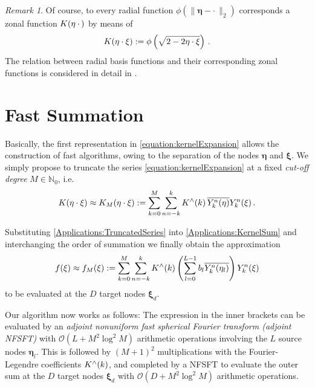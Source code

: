 \documentclass[11pt,a4paper,twoside,bibtotoc]{scrartcl}
\theoremstyle{plain}
\theoremstyle{definition}
\theoremstyle{remark}
\newtheorem{remark}[theorem]{Remark}
\newcommand{\NZ}{\ensuremath{\mathbb{N}_{0}}}
\newcommand{\fun}[2]{\ensuremath{#1{\hspace{-0.4ex}}\left(#2\right)}}
\numberwithin{equation}{section}
\numberwithin{table}{section}
\numberwithin{figure}{section}
\begin{document}
\begin{remark}
Of course, to every radial function $\phi(\|\mathbf{\eta} - \cdot \,\|_2)$ corresponds a zonal function 
$\fun{K}{\mathbf{\eta} \: \cdot \,}$ by means of 
\[
  \fun{K}{\mathbf{\eta} \cdot \mathbf{\xi}} := \phi\left(\sqrt{2-2\mathbf{\eta} \cdot
  \mathbf{\xi}}\right)\,.
\]
The relation between radial basis functions and their corresponding zonal
functions is considered in detail in \cite{CaFi}.
\end{remark}

\section{Fast Summation}
Basically, the first representation in \eqref{equation:kernelExpansion} allows
the construction of fast algorithms, owing to the separation of the
nodes $\mathbf{\eta}$ and $\mathbf{\xi}$.
We simply propose to truncate the series \eqref{equation:kernelExpansion} at a 
fixed \emph{cut-off degree} $M \in \NZ$, i.e.
\begin{equation}
  \label{Applications:TruncatedSeries}
  \fun{K}{\mathbf{\eta} \cdot \mathbf{\xi}} \approx \fun{K_{M}}{\mathbf{\eta} \cdot
  \mathbf{\xi}} := \sum_{k=0}^{M} \sum_{n=-k}^k \fun{K^{\wedge}}{k}
  \overline{\fun{Y_{k}^n}{\mathbf{\eta}}} \fun{Y_{k}^n}{\mathbf{\xi}}.
\end{equation}

Substituting \eqref{Applications:TruncatedSeries} into
\eqref{Applications:KernelSum} and interchanging the order of summation we
finally obtain the approximation
\begin{equation}
 \label{Eq:truncf_M}
  \fun{f}{\mathbf{\xi}} \approx \fun{f_{M}}{\mathbf{\xi}} := \sum_{k=0}^{M} \sum_{n=-k}^k \fun{K^{\wedge}}{k}
  \left(\sum_{l = 0}^{L-1} b_{l} \overline{\fun{Y_{k}^n}{\mathbf{\eta}_{l}}}\right)
  \fun{Y_{k}^n}{\mathbf{\xi}}
\end{equation}
to be evaluated at the $D$ target nodes $\mathbf{\xi}_{d}$.

Our algorithm now works as follows: The expression in the inner brackets 
can be evaluated by an \emph{adjoint nonuniform fast spherical Fourier 
transform (adjoint NFSFT)} with $\mathcal{O}(L + M^2 \log^2 M)$ arithmetic 
operations involving the $L$ source nodes $\mathbf{\eta}_{l}$. This is followed 
by $(M+1)^2$ multiplications with the Fourier-Legendre coefficients 
$\fun{K^{\wedge}}{k}$, and completed by a NFSFT to evaluate the
outer sum at the $D$ target nodes $\mathbf{\xi}_{d}$ with $\mathcal{O}\left(D + M^2 \log^2
M\right)$ arithmetic operations.
\end{document}
